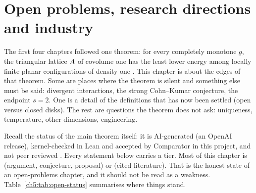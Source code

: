 \chapter{Open problems, research directions and industry}
\label{ch5:ch:open}

The first four chapters followed one theorem: for every completely monotone $g$, the triangular lattice $A$ of
covolume one has the least lower energy among locally finite planar configurations of density one
\cite{oai}. This chapter is about the edges of that theorem. Some are places where the theorem is silent and
something else must be said: divergent interactions, the strong Cohn--Kumar conjecture, the endpoint $s=2$. One is a
detail of the definitions that has now been settled (open versus closed disks). The rest are questions the theorem
does not ask: uniqueness, temperature, other dimensions, engineering.

Recall the status of the main theorem itself: it is AI-generated (an OpenAI release), kernel-checked in Lean and
accepted by Comparator in this project, and not peer reviewed \cite{oai}. Every statement below carries a tier. Most of this chapter is \tierC{} (argument, conjecture, proposal) or
\tierL{} (cited literature). That is the honest state of an open-problems chapter, and it should not be read as a
weakness. Table~\ref{ch5:tab:open-status} summarises where things stand.

